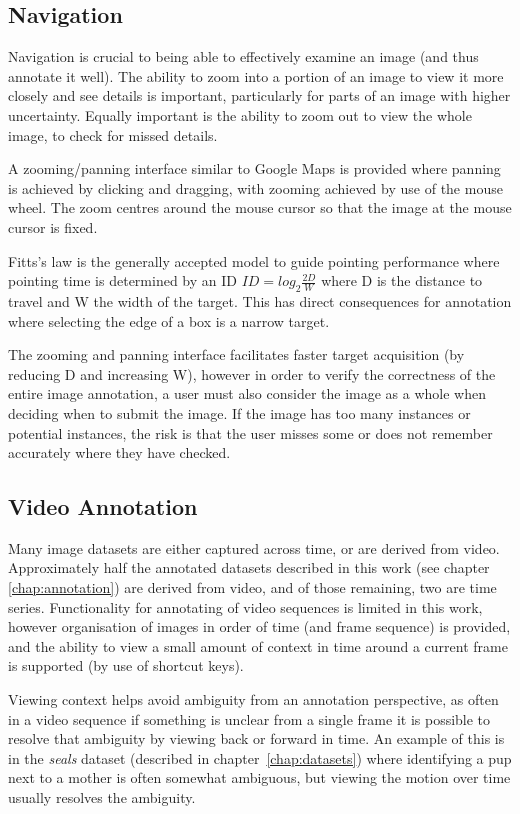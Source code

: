 \subsection {Navigation}

Navigation is crucial to being able to effectively examine an image (and thus annotate it well). The ability to zoom into a portion of an image to view it more closely and see details is important,  particularly  for parts of an image with higher uncertainty. Equally important is the ability to zoom out to view the whole image, to check for missed details. 

A zooming/panning interface similar to Google Maps is provided where panning is achieved by clicking and dragging, with zooming achieved by use of the mouse wheel. The zoom centres around the mouse cursor so that the image at the mouse cursor is fixed.

Fitts's law is the generally accepted model to guide pointing performance where pointing time is determined by an \gls{ID} $ ID = log_2 \frac{2D}{W} $ where D is the distance to travel and W the width of the target. This has direct consequences for annotation where selecting the edge of a box is a narrow target. 

The zooming and panning interface facilitates faster target acquisition (by reducing D and increasing W), however in order to verify the correctness of the entire image annotation, a user must also consider the image as a whole when deciding when to submit the image. If the image has too many instances or potential instances, the risk is that the user misses some or does not remember accurately where they have checked. 



\subsection {Video Annotation}

Many image datasets are either captured across time, or are derived from video.  Approximately half the annotated datasets described in this work (see chapter \ref{chap:annotation})  are derived from video, and of those remaining, two are time series. Functionality for annotating of video sequences is limited in this work, however organisation of images in order of time (and frame sequence) is provided, and the ability to view a small amount of context in time around a current frame is supported (by use of shortcut keys).

Viewing context helps avoid ambiguity from an annotation perspective, as often in a video sequence if something is unclear from a single frame it is possible to resolve that ambiguity by viewing back or forward in time. An example of this is in the \emph{seals} dataset (described in chapter~\ref{chap:datasets}) where identifying a pup next to a mother is often somewhat ambiguous, but viewing the motion over time usually resolves the ambiguity.

